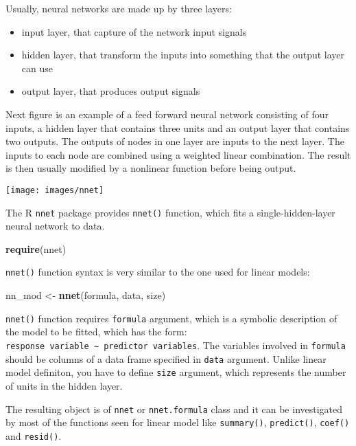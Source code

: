 \documentclass[]{book}
\newenvironment{Shaded}{\begin{snugshade}}{\end{snugshade}}
\newcommand{\KeywordTok}[1]{\textcolor[rgb]{0.13,0.29,0.53}{\textbf{{#1}}}}
\newcommand{\StringTok}[1]{\textcolor[rgb]{0.31,0.60,0.02}{{#1}}}
\newcommand{\NormalTok}[1]{{#1}}
\providecommand{\tightlist}{%
  \setlength{\itemsep}{0pt}\setlength{\parskip}{0pt}}
\def\tightlist{}
\begin{document}
Usually, neural networks are made up by three layers:

\begin{itemize}
\tightlist
\item
  input layer, that capture of the network input signals
\item
  hidden layer, that transform the inputs into something that the output
  layer can use
\item
  output layer, that produces output signals
\end{itemize}

Next figure is an example of a feed forward neural network consisting of
four inputs, a hidden layer that contains three units and an output
layer that contains two outputs. The outputs of nodes in one layer are
inputs to the next layer. The inputs to each node are combined using a
weighted linear combination. The result is then usually modified by a
nonlinear function before being output.

\texttt{[image: images/nnet]}

The R \texttt{nnet} package provides \texttt{nnet()} function, which
fits a single-hidden-layer neural network to data.

\begin{Shaded}
\begin{Highlighting}[]
\KeywordTok{require}\NormalTok{(nnet)}
\end{Highlighting}
\end{Shaded}

\texttt{nnet()} function syntax is very similar to the one used for
linear models:

\begin{Shaded}
\begin{Highlighting}[]
\NormalTok{nn_mod <-}\StringTok{ }\KeywordTok{nnet}\NormalTok{(formula, data, size)}
\end{Highlighting}
\end{Shaded}

\texttt{nnet()} function requires \texttt{formula} argument, which is a
symbolic description of the model to be fitted, which has the form:
\texttt{response\ variable\ ∼\ predictor\ variables}. The variables
involved in \texttt{formula} should be columns of a data frame specified
in \texttt{data} argument. Unlike linear model definiton, you have to
define \texttt{size} argument, which represents the number of units in
the hidden layer.

The resulting object is of \texttt{nnet} or \texttt{nnet.formula} class
and it can be investigated by most of the functions seen for linear
model like \texttt{summary()}, \texttt{predict()}, \texttt{coef()} and
\texttt{resid()}.
\end{document}
